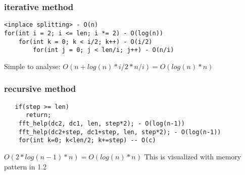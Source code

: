 \subsubsection{iterative method}
\begin{lstlisting}
<inplace splitting> - O(n)
for(int i = 2; i <= len; i *= 2) - O(log(n))
	for(int k = 0; k < i/2; k++) - O(i/2)
		for(int j = 0; j < len/i; j++) - O(n/i)

\end{lstlisting}
Simple to analyse:
\begin{math}
O(n + log(n) * i/2 * n/i) = O(log(n)*n)
\end{math}
\subsubsection{recursive method}
\begin{lstlisting}
   if(step >= len)
      return;
    fft_help(dc2, dc1, len, step*2); - O(log(n-1))
    fft_help(dc2+step, dc1+step, len, step*2); - O(log(n-1))
    for(int k=0; k<len/2; k+=step) -- O(c)
\end{lstlisting}
\begin{math}
O(2*log(n-1) * n) = O(log(n)*n)
\end{math}\newline
This is visualized with memory pattern in 1.2